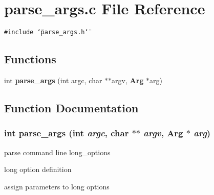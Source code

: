 \section{parse\_\-args.c File Reference}
\label{parse__args_8c}
{\tt \#include \char`\"{}parse\_\-args.h\char`\"{}}\par
\subsection*{Functions}
\begin{CompactItemize}
\item 
int {\bf parse\_\-args} (int argc, char $\ast$$\ast$argv, {\bf Arg} $\ast$arg)
\end{CompactItemize}


\subsection{Function Documentation}
\subsubsection{\setlength{\rightskip}{0pt plus 5cm}int parse\_\-args (int {\em argc}, char $\ast$$\ast$ {\em argv}, {\bf Arg} $\ast$ {\em arg})}\label{parse__args_8c_dfb81e9b882e6aa0b57d2ca15a1564ba}


parse command line long\_\-options 

long option definition

assign parameters to long options 